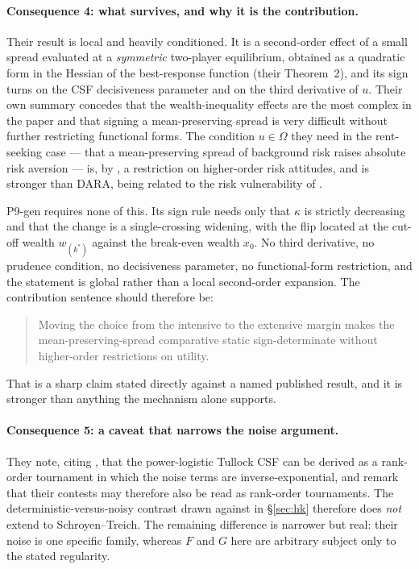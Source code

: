 \documentclass[11pt,a4paper]{article}
\begin{document}
\paragraph{Consequence 4: what survives, and why it is the contribution.} Their
result is local and heavily conditioned. It is a second-order effect of a small
spread evaluated at a \emph{symmetric} two-player equilibrium, obtained as a
quadratic form in the Hessian of the best-response function (their Theorem~2),
and its sign turns on the CSF decisiveness parameter and on the third derivative
of $u$. Their own summary concedes that the wealth-inequality effects are the
most complex in the paper and that signing a mean-preserving spread is very
difficult without further restricting functional forms. The condition
$u \in \Omega$ they need in the rent-seeking case --- that a mean-preserving
spread of background risk raises absolute risk aversion --- is, by
\citet{EeckhoudtGollierSchlesinger1996}, a restriction on higher-order risk
attitudes, and is stronger than DARA, being related to the risk vulnerability of
\citet{GollierPratt1996}.

P9-gen requires none of this. Its sign rule needs only that $\kappa$ is strictly
decreasing and that the change is a single-crossing widening, with the flip
located at the cut-off wealth $w_{(k^*)}$ against the break-even wealth $x_0$. No third derivative, no prudence condition,
no decisiveness parameter, no functional-form restriction, and the statement is
global rather than a local second-order expansion. The contribution sentence
should therefore be:

\begin{quote}
Moving the choice from the intensive to the extensive margin makes the
mean-preserving-spread comparative static sign-determinate without higher-order
restrictions on utility.
\end{quote}

That is a sharp claim stated directly against a named published result, and it
is stronger than anything the mechanism alone supports.

\paragraph{Consequence 5: a caveat that narrows the noise argument.} They note,
citing \citet{Jia2008}, that the power-logistic Tullock CSF can be derived as a
rank-order tournament in which the noise terms are inverse-exponential, and
remark that their contests may therefore also be read as rank-order
tournaments. The deterministic-versus-noisy contrast drawn against
\citet{HopkinsKornienko2010} in \S\ref{sec:hk} therefore does \emph{not} extend
to Schroyen--Treich. The remaining difference is narrower but real: their noise
is one specific family, whereas $F$ and $G$ here are arbitrary subject only to
the stated regularity.
\end{document}

